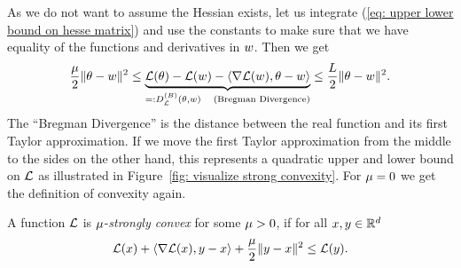 As we do not want to assume the Hessian exists, let us integrate (\ref{eq:
upper lower bound on hesse matrix}) and use the constants to make sure that we
have equality of the functions and derivatives in \(w\). Then we get
\begin{align}\label{eq: bregman divergence upper and lower bound}
	\frac{\mu}{2}\| \theta - w\|^2
	\le \underbrace{
		\mathcal{L}(\theta) - \mathcal{L}(w) - \langle \nabla \mathcal{L}(w), \theta-w\rangle
	}_{=:D^{(B)}_{\mathcal{L}}(\theta, w)\quad\text{(Bregman Divergence)}}
	\le \frac{L}{2}\| \theta - w\|^2.
\end{align}
The ``Bregman Divergence'' is the distance between the real function and its first
Taylor approximation. If we move the first Taylor approximation from the
middle to the sides on the other hand, this represents a quadratic upper and lower
bound on \(\mathcal{L}\) as illustrated in Figure~\ref{fig: visualize strong
convexity}. For \(\mu=0\) we get the definition of convexity again.
\begin{definition}\label{def: strong convexity}
	A function \(\mathcal{L}\) is \(\mu\)-\emph{strongly convex} for some
	\(\mu>0\), if for all \(x,y\in\mathbb{R}^d\)
	\begin{align*}
		\mathcal{L}(x) + \langle \nabla \mathcal{L}(x), y-x\rangle + \frac{\mu}{2}\|y-x\|^2 \le \mathcal{L}(y).
	\end{align*}
\end{definition}

